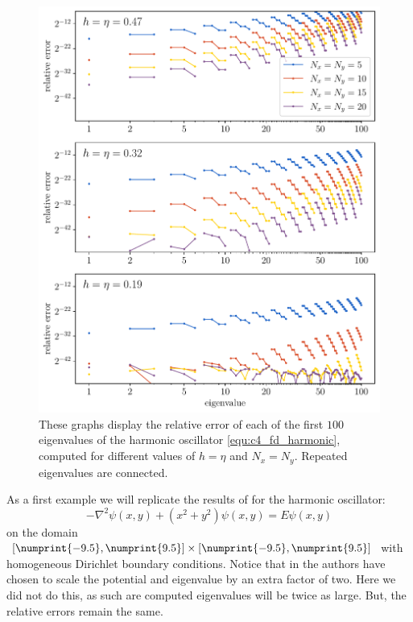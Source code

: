 \begin{figure}
    \begin{center}
        \includegraphics[width=\textwidth]{img/chapter4/fd_harmonic.pdf}
    \end{center}
    \caption{These graphs display the relative error of each of the first $100$ eigenvalues of the harmonic oscillator \eqref{equ:c4_fd_harmonic}, computed for different values of $h = \eta$ and $N_x = N_y$. Repeated eigenvalues are connected.}
    \label{fig:c4_fd_harmonic}
\end{figure}

As a first example we will replicate the results of \cite{wang_new_2009} for the harmonic oscillator:
\begin{equation}\label{equ:c4_fd_harmonic}
    -\nabla^2 \psi(x, y) + \left(x^2 + y^2\right) \psi(x, y) = E \psi(x, y)
\end{equation}
on the domain $[\numprint{-9.5}, \numprint{9.5}] \times [\numprint{-9.5}, \numprint{9.5}]$ with homogeneous Dirichlet boundary conditions. Notice that in \cite{wang_new_2009} the authors have chosen to scale the potential and eigenvalue by an extra factor of two. Here we did not do this, as such are computed eigenvalues will be twice as large. But, the relative errors remain the same.

